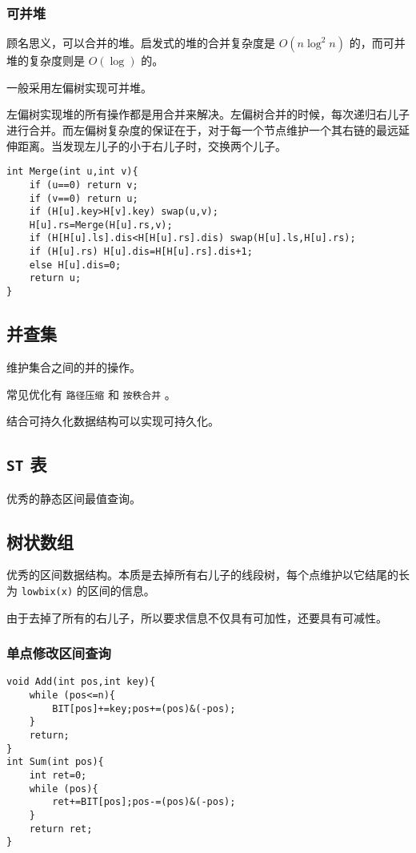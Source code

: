 \documentclass[UTF-8]{ctexart}
\begin{document}
	\subsubsection{可并堆}
	顾名思义，可以合并的堆。启发式的堆的合并复杂度是 $O(n\log^2n)$ 的，而可并堆的复杂度则是 $O(\log)$ 的。
	
	一般采用左偏树实现可并堆。
	
	左偏树实现堆的所有操作都是用合并来解决。左偏树合并的时候，每次递归右儿子进行合并。而左偏树复杂度的保证在于，对于每一个节点维护一个其右链的最远延伸距离。当发现左儿子的小于右儿子时，交换两个儿子。
\begin{verbatim}
int Merge(int u,int v){
    if (u==0) return v;
    if (v==0) return u;
    if (H[u].key>H[v].key) swap(u,v);
    H[u].rs=Merge(H[u].rs,v);
    if (H[H[u].ls].dis<H[H[u].rs].dis) swap(H[u].ls,H[u].rs);
    if (H[u].rs) H[u].dis=H[H[u].rs].dis+1;
    else H[u].dis=0;
    return u;
}
\end{verbatim}
	\subsection{并查集}
	维护集合之间的并的操作。
	
	常见优化有 \texttt{路径压缩} 和 \texttt{按秩合并} 。 
	
	结合可持久化数据结构可以实现可持久化。
	\subsection{\texttt{ST} 表}
	优秀的静态区间最值查询。
	\subsection{树状数组}
	优秀的区间数据结构。本质是去掉所有右儿子的线段树，每个点维护以它结尾的长为 \texttt{lowbix(x)} 的区间的信息。
	
	由于去掉了所有的右儿子，所以要求信息不仅具有可加性，还要具有可减性。
	
	\subsubsection{单点修改区间查询}
\begin{verbatim}
void Add(int pos,int key){
    while (pos<=n){
        BIT[pos]+=key;pos+=(pos)&(-pos);
    }
    return;
}
int Sum(int pos){
    int ret=0;
    while (pos){
        ret+=BIT[pos];pos-=(pos)&(-pos);
    }
    return ret;
}
\end{verbatim}
\end{document}
